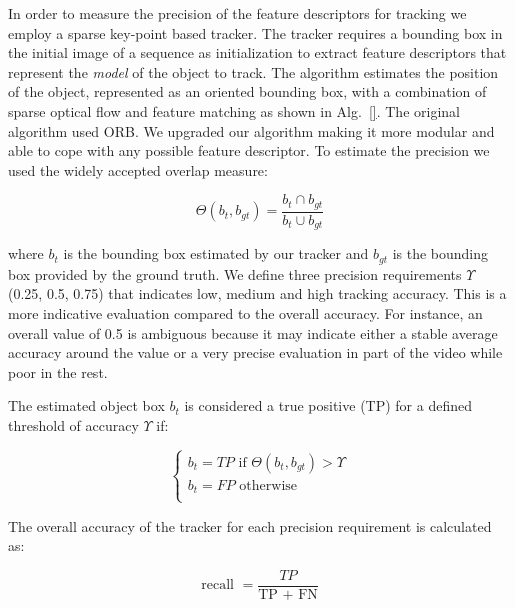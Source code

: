 In order to measure the precision of the feature descriptors for tracking we employ a sparse key-point based tracker. The tracker requires a bounding box in the initial image of a sequence as initialization to extract feature descriptors that represent the \textit{model} of the object to track. The algorithm estimates the position of the object, represented as an oriented bounding box, with a combination of sparse optical flow and feature matching as shown in Alg.~\ref{}. The original algorithm used ORB. We upgraded our algorithm making it more modular and able to cope with any possible feature descriptor. To estimate the precision we used the widely accepted overlap measure:

\begin{equation}
	\Theta (b_{t}, b_{gt}) = \frac{b_{t} \cap b_{gt}}{b_{t} \cup b_{gt}}
\end{equation}

where \textit{$b_{t}$} is the bounding box estimated by our tracker and
\textit{$b_{gt}$} is the bounding box provided by the ground truth. We define 
three precision requirements $\Upsilon$ (0.25, 0.5, 0.75) that indicates low, medium and high tracking accuracy. This is a more indicative evaluation compared to the overall accuracy. For instance, an overall value of 0.5 is ambiguous because it may indicate either a stable average accuracy around the value or a very precise evaluation in part of the video while poor in the rest.

The estimated object box \textit{$b_{t}$} is considered a true positive (TP) for a defined threshold of
accuracy $\Upsilon$ if:

\begin{equation}
\begin{cases}
b_{t} = TP  \text{ if } \Theta(b_{t}, b_{gt}) > \Upsilon \\
b_{t} = FP  \text{ otherwise }\\
\end{cases}
\end{equation}

The overall accuracy of the tracker for each precision requirement is calculated as:

\begin{equation}
\text{recall } = \frac{TP}{\text{TP } + \text{ FN}}
\end{equation}



